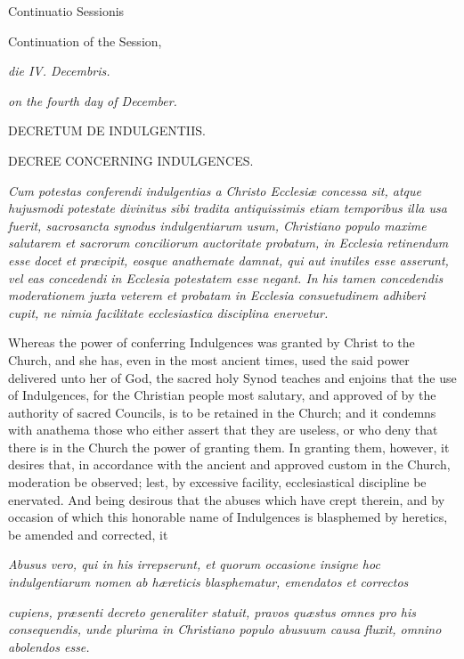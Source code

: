 Continuatio Sessionis

Continuation of the Session,

\emph{die IV. Decembris.}

\emph{on the fourth day of December.}

DECRETUM DE INDULGENTIIS.

DECREE CONCERNING INDULGENCES.

\emph{Cum potestas conferendi indulgentias a Christo Ecclesiæ concessa sit, atque hujusmodi potestate divinitus sibi tradita antiquissimis etiam temporibus illa usa fuerit, sacrosancta synodus indulgentiarum usum, Christiano populo maxime salutarem et sacrorum conciliorum auctoritate probatum, in Ecclesia retinendum esse docet et præcipit, eosque anathemate damnat, qui aut inutiles esse asserunt, vel eas concedendi in Ecclesia potestatem esse negant. In his tamen concedendis moderationem juxta veterem et probatam in Ecclesia consuetudinem adhiberi cupit, ne nimia facilitate ecclesiastica disciplina enervetur.}

Whereas the power of conferring Indulgences was granted by Christ to the Church, and she has, even in the most ancient times, used the said power delivered unto her of God, the sacred holy Synod teaches and enjoins that the use of Indulgences, for the Christian people most salutary, and approved of by the authority of sacred Councils, is to be retained in the Church; and it condemns with anathema those who either assert that they are useless, or who deny that there is in the Church the power of granting them. In granting them, however, it desires that, in accordance with the ancient and approved custom in the Church, moderation be observed; lest, by excessive facility, ecclesiastical discipline be enervated. And being desirous that the abuses which have crept therein, and by occasion of which this honorable name of Indulgences is blasphemed by heretics, be amended and corrected, it

\emph{Abusus vero, qui in his irrepserunt, et quorum occasione insigne hoc indulgentiarum nomen ab hæreticis blasphematur, emendatos et correctos }

\emph{cupiens, præsenti decreto generaliter statuit, pravos quæstus omnes pro his consequendis, unde plurima in Christiano populo abusuum causa fluxit, omnino abolendos esse. }

